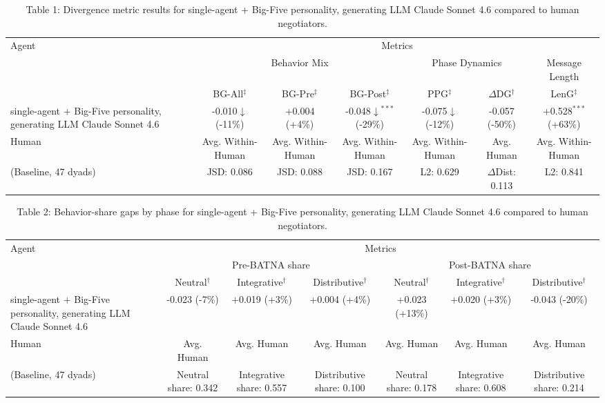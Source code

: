 \begin{table}[t]
\centering
\begin{tabular}{lcccccc}
\toprule
\multirow{3}{*}{Agent} & \multicolumn{6}{c}{Metrics} \\
\cmidrule(lr){2-7}
 & \multicolumn{3}{c}{Behavior Mix} & \multicolumn{2}{c}{Phase Dynamics} & \multicolumn{1}{c}{Message Length} \\
\cmidrule(lr){2-4} \cmidrule(lr){5-6} \cmidrule(lr){7-7}
 & BG-All$^\ddagger$ & BG-Pre$^\ddagger$ & BG-Post$^\ddagger$ & PPG$^\ddagger$ & $\Delta$DG$^\dagger$ & LenG$^\ddagger$ \\
\midrule
single-agent + Big-Five personality, generating LLM Claude Sonnet 4.6 & -0.010$\downarrow$ (-11\%) & +0.004 (+4\%) & -0.048$\downarrow$$^{***}$ (-29\%) & -0.075$\downarrow$ (-12\%) & -0.057 (-50\%) & +0.528$^{***}$ (+63\%) \\
\midrule
Human & Avg. Within-Human & Avg. Within-Human & Avg. Within-Human & Avg. Within-Human & Avg. Human & Avg. Within-Human \\
(Baseline, 47 dyads) & JSD: 0.086 & JSD: 0.088 & JSD: 0.167 & L2: 0.629 & $\Delta$Dist: 0.113 & L2: 0.841 \\
\bottomrule
\end{tabular}
\caption{Table 1: Divergence metric results for single-agent + Big-Five personality, generating LLM Claude Sonnet 4.6 compared to human negotiators.}
\end{table}

\begin{table}[t]
\centering
\begin{tabular}{lcccccc}
\toprule
\multirow{3}{*}{Agent} & \multicolumn{6}{c}{Metrics} \\
\cmidrule(lr){2-7}
 & \multicolumn{3}{c}{Pre-BATNA share} & \multicolumn{3}{c}{Post-BATNA share} \\
\cmidrule(lr){2-4} \cmidrule(lr){5-7}
 & Neutral$^\dagger$ & Integrative$^\dagger$ & Distributive$^\dagger$ & Neutral$^\dagger$ & Integrative$^\dagger$ & Distributive$^\dagger$ \\
\midrule
single-agent + Big-Five personality, generating LLM Claude Sonnet 4.6 & -0.023 (-7\%) & +0.019 (+3\%) & +0.004 (+4\%) & +0.023 (+13\%) & +0.020 (+3\%) & -0.043 (-20\%) \\
\midrule
Human & Avg. Human & Avg. Human & Avg. Human & Avg. Human & Avg. Human & Avg. Human \\
(Baseline, 47 dyads) & Neutral share: 0.342 & Integrative share: 0.557 & Distributive share: 0.100 & Neutral share: 0.178 & Integrative share: 0.608 & Distributive share: 0.214 \\
\bottomrule
\end{tabular}
\caption{Table 2: Behavior-share gaps by phase for single-agent + Big-Five personality, generating LLM Claude Sonnet 4.6 compared to human negotiators.}
\end{table}

